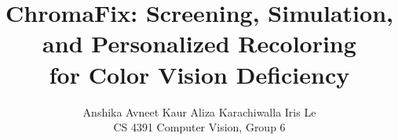 \documentclass[10pt,twocolumn,letterpaper]{article}
\title{ChromaFix: Screening, Simulation, and Personalized Recoloring\\for Color Vision Deficiency}
\author{Anshika \qquad Avneet Kaur \qquad Aliza Karachiwalla \qquad Iris Le\\
CS 4391 Computer Vision, Group 6}
\begin{document}
\maketitle








{
    \small
    
    
}
\end{document}
